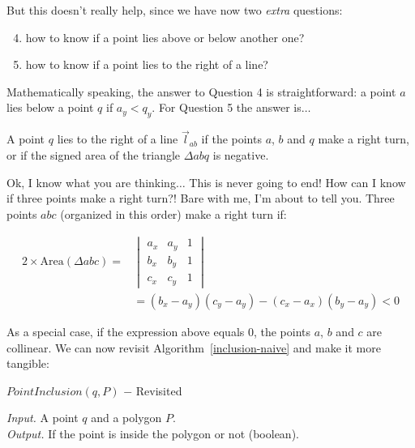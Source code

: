 \documentclass[twoside,12pt, a4paper]{memoir}
\begin{document}
But this doesn't really help, since we have now two \textit{extra} questions:

\begin{enumerate}
\setcounter{enumi}{3}
  \item how to know if a point lies above or below another one?
  \item how to know if a point lies to the right of a line?
\end{enumerate}

Mathematically speaking, the answer to Question 4 is straightforward: a point $a$ lies below a point $q$ if $a_{y} < q_{y}$. For Question 5 the answer is$\ldots$

A point $q$ lies to the right of a line $\overrightarrow{l}_{ab}$ if the points $a$, $b$ and $q$ make a right turn, or if the signed area of the triangle $\Delta abq$ is negative.

Ok, I know what you are thinking$\ldots$ This is never going to end! How can I know if three points make a right turn?! Bare with me, I'm about to tell you. Three points $abc$ (organized in this order) make a right turn if:

\begin{equation}
  \label{eq:turn}
  \begin{split}
  2 \times \text{Area} (\Delta abc) = &
      \begin{vmatrix}
        a_{x} & a_{y} & 1 \\
        b_{x} & b_{y} & 1 \\
        c_{x} & c_{y} & 1
      \end{vmatrix} \\
  & = (b_{x}-a_{y})(c_{y}-a_{y})-(c_{x}-a_{x})(b_{y}-a_{y}) < 0
  \end{split}
\end{equation}

As a special case, if the expression above equals 0, the points $a$, $b$ and $c$ are collinear. We can now revisit Algorithm~\ref{inclusion-naive} and make it more tangible:

\begin{algorithm}
\caption{$PointInclusion(q, P)$ $-$ Revisited}
\textit{Input.} A point $q$ and a polygon $P$. \\
\textit{Output.} If the point is inside the polygon or not (boolean).
\begin{algorithmic}[1]
    \EndIf{}
  \EndFor{}

  \Else{}
  \EndIf{}
\end{algorithmic}\label{inclusion-revisited}
\end{algorithm}
\end{document}
